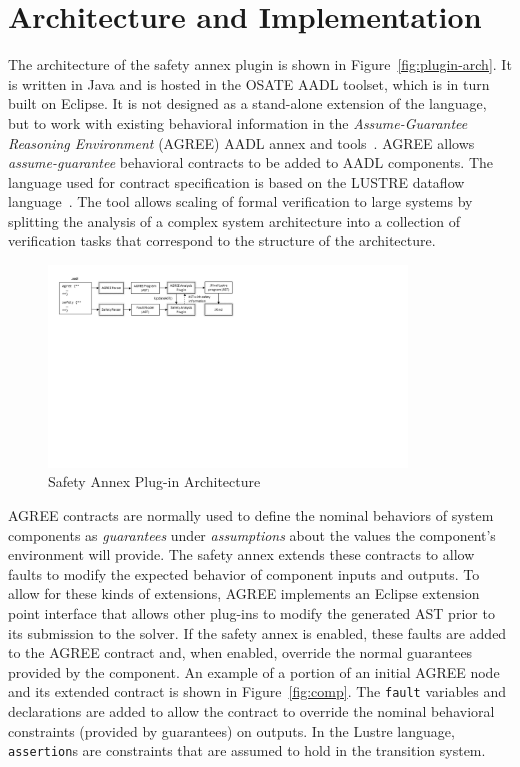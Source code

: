 \section{Architecture and Implementation}


The architecture of the safety annex plugin is shown in Figure~\ref{fig:plugin-arch}.  It is written in Java and is hosted in the OSATE AADL toolset, which is in turn built on Eclipse.  It is not designed as a stand-alone extension of the language, but to work with existing behavioral information in the {\em Assume-Guarantee Reasoning Environment} (AGREE) AADL annex and tools~\cite{NFM2012:CoGaMiWhLaLu}.  AGREE allows {\em assume-guarantee} behavioral contracts to be added to AADL components.  The language used for contract specification is based on the LUSTRE dataflow language~\cite{Halbwachs91:IEEE}. The tool allows scaling of formal verification to large systems by splitting the analysis of a complex system architecture into a collection of verification tasks that correspond to the structure of the architecture.

\begin{figure}
\begin{center}
\includegraphics[trim=0 400 430 0,clip,width=0.85\textwidth]{images/arch.png}
\end{center}
\vspace{-0.2in}
\caption{Safety Annex Plug-in Architecture}
\label{fig:agreeContract}
\end{figure}

AGREE contracts are normally used to define the nominal behaviors of system components as {\em guarantees} under {\em assumptions} about the values the component's environment will provide.  The safety annex extends these contracts to allow faults to modify the expected behavior of component inputs and outputs.  To allow for these kinds of extensions, AGREE implements an Eclipse extension point interface that allows other plug-ins to modify the generated AST prior to its submission to the solver.  If the safety annex is enabled, these faults are added to the AGREE contract and, when enabled, override the normal guarantees provided by the component.  An example of a portion of an initial AGREE node and its extended contract is shown in Figure~\ref{fig:comp}.  The \texttt{fault} variables and declarations are added to allow the contract to override the nominal behavioral constraints (provided by guarantees) on outputs.  In the Lustre language, \texttt{assertion}s are constraints that are assumed to hold in the transition system.


